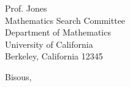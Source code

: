 \documentclass[11pt, a4paper]{letter} %
\begin{document}
\begin{letter}{
	Prof. Jones\\
	Mathematics Search Committee\\
	Department of Mathematics\\
	University of California\\
	Berkeley, California 12345
}
\closing{Bisous,}


\def\thefootnote{}
\def\footnoterule{\hrule}
\footnotetext{\hspace*{\fill}{\footnotesize\em Footnote text}}
\def\thefootnote{\arabic{footnote}}


\end{letter}
\end{document}
